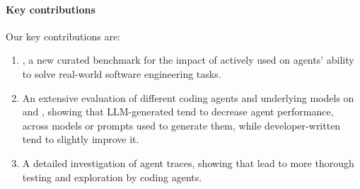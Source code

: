 \paragraph{Key contributions} Our key contributions are:
\begin{enumerate}
    \item \planbench{}, a new curated benchmark for the impact of actively used \agentsmds{} on agents' ability to solve real-world software engineering tasks.
    \item An extensive evaluation of different coding agents and underlying models on \planbench{} and \swebench{}, showing that LLM-generated \agentsmds{} tend to decrease agent performance, across models or prompts used to generate them, while developer-written \agentsmds{} tend to slightly improve it.
    \item A detailed investigation of agent traces, showing that \agentsmds{} lead to more thorough testing and exploration by coding agents.
\end{enumerate}
